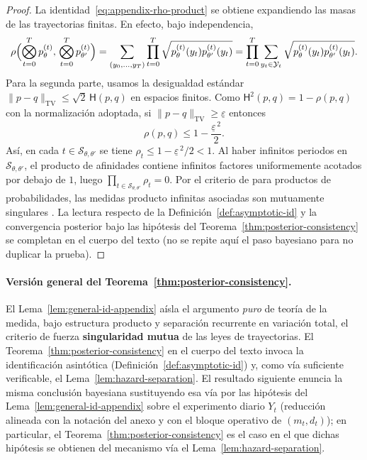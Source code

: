 \documentclass[12pt]{article}
\providecommand{\textcite}{\citet}
\theoremstyle{definition}
\theoremstyle{remark}
\newcommand{\1}{\mathbf{1}}
\begin{document}
\begin{proof}
La identidad~\eqref{eq:appendix-rho-product} se obtiene expandiendo las masas de las trayectorias finitas. En efecto, bajo independencia,
\[
\rho\Bigl(\bigotimes_{t=0}^{T} p_\theta^{(t)},\,\bigotimes_{t=0}^{T} p_{\theta'}^{(t)}\Bigr)
=\sum_{(y_0,\ldots,y_T)}\prod_{t=0}^{T}\sqrt{p_\theta^{(t)}(y_t)p_{\theta'}^{(t)}(y_t)}
=\prod_{t=0}^{T}\sum_{y_t\in\mathcal{Y}_t}\sqrt{p_\theta^{(t)}(y_t)p_{\theta'}^{(t)}(y_t)}.
\]
Para la segunda parte, usamos la desigualdad estándar $\|p-q\|_{\mathrm{TV}}\le \sqrt{2}\,\mathsf{H}(p,q)$ en espacios finitos. Como $\mathsf{H}^2(p,q)=1-\rho(p,q)$ con la normalización adoptada, si $\|p-q\|_{\mathrm{TV}}\ge\underline{\varepsilon}$ entonces
\[
\rho(p,q)\le 1-\frac{\underline{\varepsilon}^{\,2}}{2}.
\]
Así, en cada $t\in\mathcal{S}_{\theta,\theta'}$ se tiene $\rho_t\le 1-\underline{\varepsilon}^{\,2}/2<1$. Al haber infinitos periodos en $\mathcal{S}_{\theta,\theta'}$, el producto de afinidades contiene infinitos factores uniformemente acotados por debajo de $1$, luego $\prod_{t\in\mathcal{S}_{\theta,\theta'}}\rho_t=0$. Por el criterio de \textcite{Kakutani1948} para productos de probabilidades, las medidas producto infinitas asociadas son mutuamente singulares \textcite{Shiryaev2019Probability}. La lectura respecto de la Definición~\ref{def:asymptotic-id} y la convergencia posterior bajo las hipótesis del Teorema~\ref{thm:posterior-consistency} se completan en el cuerpo del texto \textup{(}no se repite aquí el paso bayesiano para no duplicar la prueba\textup{)}.
\end{proof}

\medskip
\paragraph{Versión general del Teorema~\ref{thm:posterior-consistency}.}
El Lema~\ref{lem:general-id-appendix} aísla el argumento \emph{puro} de teoría de la medida, bajo estructura producto y separación recurrente en variación total, el criterio de \textcite{Kakutani1948} fuerza \textbf{singularidad mutua} de las leyes de trayectorias. El Teorema~\ref{thm:posterior-consistency} en el cuerpo del texto invoca la identificación asintótica \textup{(}Definición~\ref{def:asymptotic-id}\textup{)} y, como vía suficiente verificable, el Lema~\ref{lem:hazard-separation}. El resultado siguiente enuncia la misma conclusión bayesiana sustituyendo esa vía por las hipótesis del Lema~\ref{lem:general-id-appendix} sobre el experimento diario $Y_t$ \textup{(}reducción alineada con la notación del anexo y con el bloque operativo de $(m_t,d_t)$\textup{)}; en particular, el Teorema~\ref{thm:posterior-consistency} es el caso en el que dichas hipótesis se obtienen del mecanismo vía el Lema~\ref{lem:hazard-separation}.
\end{document}
